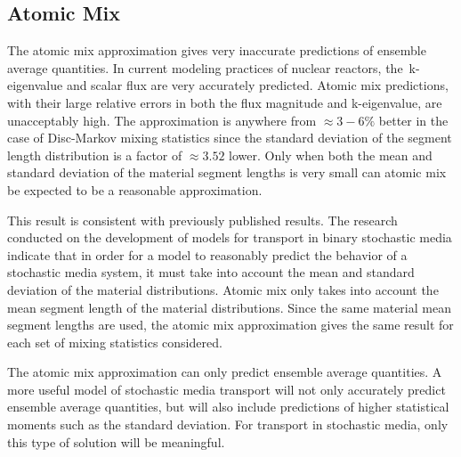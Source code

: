 \belowSubSecSkip

\subsection{Atomic Mix}
\label{sec:Conclusions-am}

\noindent
	\indent The atomic mix approximation gives very inaccurate predictions of ensemble
	average quantities.  In current modeling practices of nuclear reactors, the~k-eigenvalue
	and scalar flux are very accurately predicted.  Atomic mix predictions, with their large
	relative errors
	in both the flux magnitude and k-eigenvalue, are 
	unacceptably high.  The approximation is anywhere from ${\approx3 - 6\%}$ better in the
	case of Disc-Markov mixing statistics since the standard deviation of the segment
	length distribution is a factor of ${\approx3.52}$ lower.  Only when both the mean and
	standard deviation of the material segment lengths is very small can atomic mix be 
	expected to be a reasonable approximation.

\noindent
	\indent This result is consistent with previously published results.  The research 
	conducted on the development of models for transport in binary stochastic media indicate that
	in order for a model to reasonably predict the behavior of a stochastic media system,
	it must take into account the mean and standard deviation of the material distributions.
	Atomic mix only takes into account the mean segment length of the material distributions.
	Since the same material mean segment lengths are used, the atomic mix approximation
	gives the same result for each set of mixing statistics considered.
	
\noindent
	\indent The atomic mix approximation can only predict ensemble average 
	quantities.  A more useful model of stochastic media transport will not only accurately
	predict ensemble average quantities, but will also include predictions of higher statistical 
	moments such as the standard deviation.  For transport in stochastic media, only this 
	type of solution will be meaningful.  

\belowSubSecSkip

